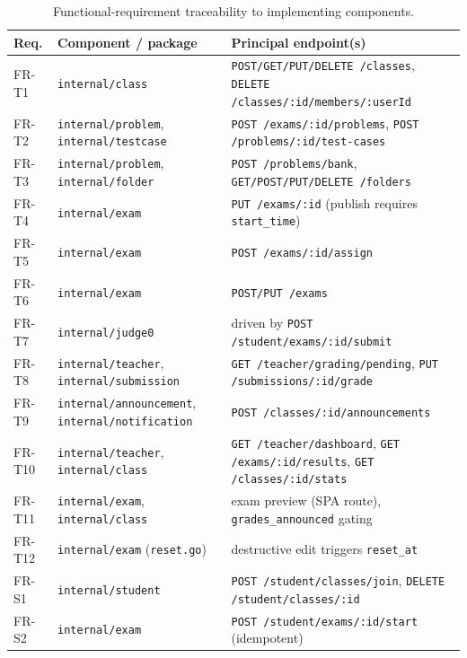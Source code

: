 \begin{table}[htbp]
\centering
\caption{Functional-requirement traceability to implementing components.}
\label{tab:trace}
\small
\begin{tabularx}{\textwidth}{@{}L{1.4cm} L{4.2cm} X@{}}
\toprule
\textbf{Req.} & \textbf{Component / package} & \textbf{Principal endpoint(s)} \\
\midrule
FR-T1  & \texttt{internal/class}        & \texttt{POST/GET/PUT/DELETE /classes}, \texttt{DELETE /classes/:id/members/:userId} \\
FR-T2  & \texttt{internal/problem}, \texttt{internal/testcase} & \texttt{POST /exams/:id/problems}, \texttt{POST /problems/:id/test-cases} \\
FR-T3  & \texttt{internal/problem}, \texttt{internal/folder}   & \texttt{POST /problems/bank}, \texttt{GET/POST/PUT/DELETE /folders} \\
FR-T4  & \texttt{internal/exam}         & \texttt{PUT /exams/:id} (publish requires \texttt{start\_time}) \\
FR-T5  & \texttt{internal/exam}         & \texttt{POST /exams/:id/assign} \\
FR-T6  & \texttt{internal/exam}         & \texttt{POST/PUT /exams} \\
FR-T7  & \texttt{internal/judge0}       & driven by \texttt{POST /student/exams/:id/submit} \\
FR-T8  & \texttt{internal/teacher}, \texttt{internal/submission} & \texttt{GET /teacher/grading/pending}, \texttt{PUT /submissions/:id/grade} \\
FR-T9  & \texttt{internal/announcement}, \texttt{internal/notification} & \texttt{POST /classes/:id/announcements} \\
FR-T10 & \texttt{internal/teacher}, \texttt{internal/class}    & \texttt{GET /teacher/dashboard}, \texttt{GET /exams/:id/results}, \texttt{GET /classes/:id/stats} \\
FR-T11 & \texttt{internal/exam}, \texttt{internal/class}       & exam preview (SPA route), \texttt{grades\_announced} gating \\
FR-T12 & \texttt{internal/exam} (\texttt{reset.go}) & destructive edit triggers \texttt{reset\_at} \\
\addlinespace
FR-S1  & \texttt{internal/student}      & \texttt{POST /student/classes/join}, \texttt{DELETE /student/classes/:id} \\
FR-S2  & \texttt{internal/exam}         & \texttt{POST /student/exams/:id/start} (idempotent) \\

\end{tabularx}
\end{table}
